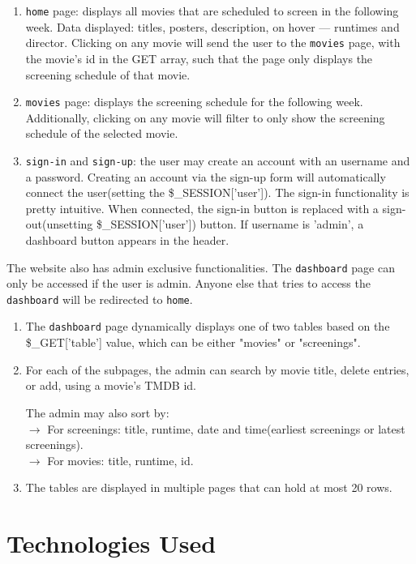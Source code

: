 \documentclass[a4paper]{article}
\begin{document}
\begin{enumerate}[label=$-$]
    \item\texttt{home} page: displays all movies that are scheduled to screen in the following week. Data displayed: titles, posters, description, on hover --- runtimes and director. Clicking on any movie will send the user to the \texttt{movies} page, with the movie's id in the GET array, such that the page only displays the screening schedule of that movie.

    \item\texttt{movies} page: displays the screening schedule for the following week. Additionally, clicking on any movie will filter to only show the screening schedule of the selected movie.

    \item\texttt{sign-in} and \texttt{sign-up}: the user may create an account with an username and a password. Creating an account via the sign-up form will automatically connect the user(setting the \$\_SESSION['user']). The sign-in functionality is pretty intuitive. When connected, the sign-in button is replaced with a sign-out(unsetting \$\_SESSION['user']) button. If username is 'admin', a dashboard button appears in the header.
\end{enumerate}

The website also has admin exclusive functionalities. The \texttt{dashboard} page can only be accessed if the user is admin. Anyone else that tries to access the \texttt{dashboard} will be redirected to \texttt{home}.

\begin{enumerate}[label=$-$]
    \item The \texttt{dashboard} page dynamically displays one of two tables based on the \$\_GET['table'] value, which can be either "movies" or "screenings".
    \item For each of the subpages, the admin can search by movie title, delete entries, or add, using a movie's TMDB id.
    
    The admin may also sort by:\\$\rightarrow$ For screenings: title, runtime, date and time(earliest screenings or latest screenings).\\$\rightarrow$ For movies: title, runtime, id.
    \item The tables are displayed in multiple pages that can hold at most 20 rows.
\end{enumerate}

\section{Technologies Used}



    
\end{document}
